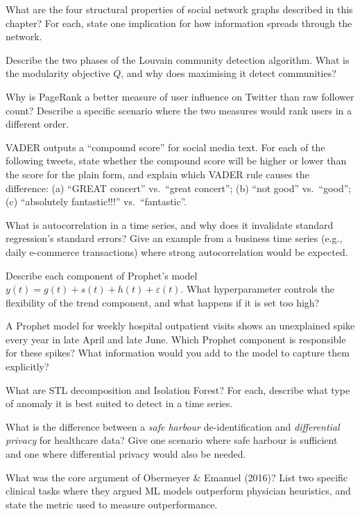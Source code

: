
\sq What are the four structural properties of social network graphs
described in this chapter? For each, state one implication for how
information spreads through the network.

\sq Describe the two phases of the Louvain community detection algorithm.
What is the modularity objective $Q$, and why does maximising it detect
communities?

\sq Why is PageRank a better measure of user influence on Twitter than
raw follower count? Describe a specific scenario where the two measures
would rank users in a different order.

\sq VADER outputs a ``compound score'' for social media text. For each
of the following tweets, state whether the compound score will be higher
or lower than the score for the plain form, and explain which VADER rule
causes the difference:
(a) ``GREAT concert'' vs.\ ``great concert'';
(b) ``not good'' vs.\ ``good'';
(c) ``absolutely fantastic!!!'' vs.\ ``fantastic''.

\sq What is autocorrelation in a time series, and why does it invalidate
standard regression's standard errors? Give an example from a business
time series (e.g., daily e-commerce transactions) where strong autocorrelation
would be expected.

\sq Describe each component of Prophet's model
$y(t) = g(t) + s(t) + h(t) + \varepsilon(t)$.
What hyperparameter controls the flexibility of the trend component,
and what happens if it is set too high?

\sq A Prophet model for weekly hospital outpatient visits shows an
unexplained spike every year in late April and late June. Which Prophet
component is responsible for these spikes? What information would you
add to the model to capture them explicitly?

\sq What are STL decomposition and Isolation Forest? For each, describe
what type of anomaly it is best suited to detect in a time series.

\sq What is the difference between a \emph{safe harbour} de-identification
and \emph{differential privacy} for healthcare data? Give one scenario
where safe harbour is sufficient and one where differential privacy
would also be needed.

\sq What was the core argument of Obermeyer \& Emanuel (2016)? List two
specific clinical tasks where they argued ML models outperform physician
heuristics, and state the metric used to measure outperformance.

